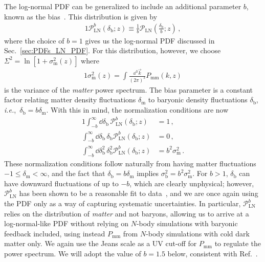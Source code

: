 \documentclass[prd,aps,10pt,nofootinbib,twocolumn,superscriptaddress,preprintnumbers,balancelastpage,longbibliography]{revtex4-1}
\begin{document}
The log-normal PDF can be generalized to include an additional parameter $b$, known as the bias~\cite{Dekel:1998eq}. 
This distribution is given by
%
\begin{alignat}{1}
    \mathcal{P}_\text{LN}^b(\delta_\text{b};z) \equiv \frac{1}{b} \mathcal{P}_\text{LN} \left(\frac{\delta_\text{b}}{b} ; z\right) \,,
\end{alignat}
%
where the choice of $b = 1$ gives us the log-normal PDF discussed in Sec.~\ref{sec:PDFs_LN_PDF}. For this distribution, however, we choose $\Sigma^2 = \ln[1 + \sigma_\text{m}^2(z)]$ where 
%
\begin{alignat}{1}
    \sigma_\text{m}^2(z) = \int \frac{\dd^3 \vec{k}}{(2\pi)^3} P_\text{mm}(k,z) 
\end{alignat}
%
is the variance of the \textit{matter} power spectrum. The bias parameter is a constant factor relating matter density fluctuations $\delta_\text{m}$ to baryonic density fluctuations $\delta_\text{b}$, \emph{i.e.},\ $\delta_\text{b} = b \delta_\text{m}$. 
With this in mind, the normalization conditions are now 
%
\begin{alignat}{1}
    \int_{-b}^\infty \dd \delta_\text{b} \, \mathcal{P}_\text{LN}^b(\delta_\text{b};z) &= 1 \,, \label{eq:LN_normalization} \\
    \int_{-b}^\infty \dd \delta_\text{b} \, \delta_\text{b} \mathcal{P}_\text{LN}^b(\delta_\text{b};z) &= 0 \,, \\
    \int_{-b}^\infty \dd \delta_\text{b}^2 \, \delta_\text{b}^2 \mathcal{P}_\text{LN}^b(\delta_\text{b}; z) &= b^2 \sigma_\text{m}^2 \label{eq:LN_variance} \,.
\end{alignat}
%
These normalization conditions follow naturally from having matter fluctuations $-1 \leq \delta_\text{m} < \infty$, and the fact that $\delta_\text{b} = b \delta_\text{m}$ implies $\sigma_\text{b}^2 = b^2 \sigma_\text{m}^2$. 
For $b > 1$, $\delta_\text{b}$ can have downward fluctuations of up to $-b$, which are clearly unphysical; however, $\mathcal{P}_\text{LN}^b$ has been shown to be a reasonable fit to data~\cite{Wild:2004me,Hurtado-Gil:2017dbm}, and we are once again using the PDF only as a way of capturing systematic uncertainties. In particular, $\mathcal{P}_\text{LN}^b$ relies on the distribution of \textit{matter} and not baryons, allowing us to arrive at a log-normal-like PDF without relying on $N$-body simulations with baryonic feedback included, using instead $P_\text{mm}$ from $N$-body simulations with cold dark matter only. 
We again use the Jeans scale as a UV cut-off for $P_\text{mm}$ to regulate the power spectrum. We will adopt the value of $b = 1.5$ below, consistent with Ref.~\cite{Hurtado-Gil:2017dbm}.  
\end{document}
